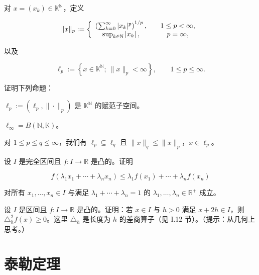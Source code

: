 \begin{exercises}
对 $ x = (x_k) \in \mathbb{K}^{\mathbb{N}} $，定义

\begin{equation*}
\|x\|_{p}:=\left\{\begin{array}{c c}{\left(\sum_{k=0}^{\infty}|x_{k}|^{p}\right)^{1/p},}&{\quad1\leq p<\infty,}\\ {\operatorname*{s u p}_{k\in\mathbb{N}}\left|x_{k}\right|,}&{\quad p=\infty,}\\ \end{array}\right.
\end{equation*}

以及

\[
\ell_{p}:=\left\{x\in\mathbb{K}^{\mathbb{N}};~\|x\|_{p}<\infty\right\},\qquad1\le p\le\infty.
\]

证明下列命题：

\begin{items}
\item

$ \ell_p := (\ell_p, \|\cdot\|_p) $ 是 $ \mathbb{K}^{\mathbb{N}} $ 的赋范子空间。

\item

$ \ell_{\infty} = B(\mathbb{N}, \mathbb{K}) $。

\item

对 $ 1 \leq p \leq q \leq \infty $，我们有 $ \ell_p \subseteq \ell_q $ 且 $ \|x\|_q \leq \|x\|_p $，$ x \in \ell_p $。

\end{items}

\item[20.]

设 $I$ 是完全区间且 $f: I \to \mathbb{R}$ 是凸的。证明

\[
f(\lambda_{1}x_{1}+\cdots+\lambda_{n}x_{n})\leq\lambda_{1}f(x_{1})+\cdots+\lambda_{n}f(x_{n})
\]

对所有 $ x_1, \ldots, x_n \in I $ 与满足 $ \lambda_1 + \cdots + \lambda_n = 1 $ 的 $ \lambda_1, \ldots, \lambda_n \in \mathbb{R}^+ $ 成立。

\item[21.]

设 $I$ 是区间且 $f: I \to \mathbb{R}$ 是凸的。证明：若 $x \in I$ 与 $h > 0$ 满足 $x + 2h \in I$，则 $\triangle_h^2 f(x) \geq 0$。这里 $\triangle_h$ 是长度为 $h$ 的差商算子（见 I.12 节）。（提示：从几何上思考。）

\end{exercises}

\section{泰勒定理}

